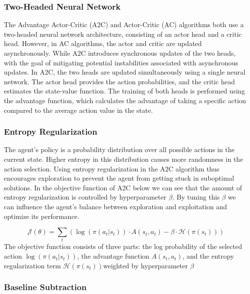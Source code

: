 \documentclass{article}
\begin{document}
\subsubsection{Two-Headed Neural Network}
\label{sssec:2hnn}

The Advantage Actor-Critic (A2C) and Actor-Critic (AC) algorithms both use a two-headed neural network architecture, consisting of an actor head and a critic head.
However, in AC algorithms, the actor and critic are updated asynchronously.
While A2C introduces synchronous updates of the two heads, with the goal of mitigating potential instabilities associated with asynchronous updates.
In A2C, the two heads are updated simultaneously using a single neural network.
The actor head provides the action probabilities, and the critic head estimates the state-value function.
The training of both heads is performed using the advantage function, which calculates the advantage of taking a specific action compared to the average action value in the state.

\subsubsection{Entropy Regularization}
\label{sssec:entreg}

The agent's policy is a probability distribution over all possible actions in the current state.
Higher entropy in this distribution causes more randomness in the action selection.
Using entropy regularization in the A2C algorithm thus encourages exploration to prevent the agent from getting stuck in suboptimal solutions.
In the objective function of A2C below we can see that the amount of entropy regularization is controlled by hyperparameter $\beta$.
By tuning this $\beta$ we can influence the agent's balance between exploration and exploitation and optimize its performance.

\[
\mathcal{J}(\theta) = \sum_{t} \left( \log(\pi(a_t|s_t)) \cdot A(s_t, a_t) - \beta \cdot \mathcal{H}(\pi(s_t)) \right)
\]
The objective function consists of three parts: the log probability of the selected action $\log(\pi(a_t|s_t))$, the advantage function $A(s_t, a_t)$, and the entropy regularization term $\mathcal{H}(\pi(s_t))$weighted by hyperparameter $\beta$

\subsubsection{Baseline Subtraction}
\label{sssec:blsub}
\end{document}
